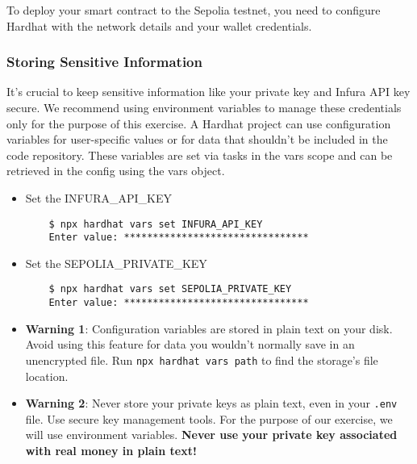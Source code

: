 \documentclass[12pt]{article}
\begin{document}
To deploy your smart contract to the Sepolia testnet, you need to configure Hardhat with the network details and your wallet credentials.

\subsubsection*{Storing Sensitive Information}

It's crucial to keep sensitive information like your private key and Infura API key secure. We recommend using environment variables to manage these credentials only for the purpose of this exercise. A Hardhat project can use configuration variables for user-specific values or for data that shouldn't be included in the code repository. These variables are set via tasks in the vars scope and can be retrieved in the config using the vars object. 

\begin{itemize}
    \item Set the INFURA\_API\_KEY
    
\begin{verbatim}
    $ npx hardhat vars set INFURA_API_KEY
    Enter value: ********************************
\end{verbatim}

    \item Set the SEPOLIA\_PRIVATE\_KEY

\begin{verbatim}
    $ npx hardhat vars set SEPOLIA_PRIVATE_KEY
    Enter value: ********************************
\end{verbatim}

\end{itemize}

\begin{itemize}
    \item \textbf{Warning 1}: Configuration variables are stored in plain text on your disk. Avoid using this feature for data you wouldn’t normally save in an unencrypted file. Run \texttt{npx hardhat vars path} to find the storage's file location.

    \item \textbf{Warning 2}: Never store your private keys as plain text, even in your \texttt{.env} file. Use secure key management tools. For the purpose of our exercise, we will use environment variables. \textbf{Never use your private key associated with real money in plain text!}
\end{itemize}
\end{document}
